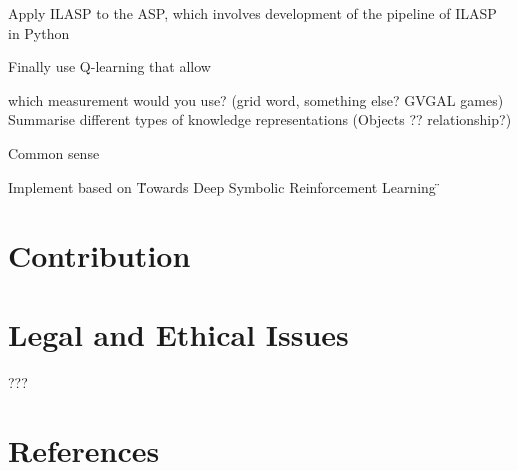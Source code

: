 \documentclass[12pt,twoside]{report}
\begin{document}
Apply ILASP to the ASP, which involves development of the pipeline of ILASP in Python

Finally use Q-learning that allow



which measurement would you use? (grid word, something else? GVGAL games)
Summarise different types of knowledge representations (Objects ?? relationship?)

Common sense

Implement based on \"Towards Deep Symbolic Reinforcement Learning \"

\section{Contribution}


\section{Legal and Ethical Issues}

???




%
%

\section{References}


\end{document}
